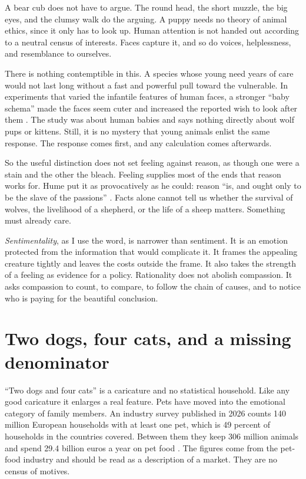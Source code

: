 \documentclass[12pt,a4paper]{book}
\begin{document}
A bear cub does not have to argue. The round head, the short muzzle, the big eyes, and the clumsy walk do the arguing. A puppy needs no theory of animal ethics, since it only has to look up. Human attention is not handed out according to a neutral census of interests. Faces capture it, and so do voices, helplessness, and resemblance to ourselves.

There is nothing contemptible in this. A species whose young need years of care would not last long without a fast and powerful pull toward the vulnerable. In experiments that varied the infantile features of human faces, a stronger ``baby schema'' made the faces seem cuter and increased the reported wish to look after them \cite{GlockerBabySchema2009}. The study was about human babies and says nothing directly about wolf pups or kittens. Still, it is no mystery that young animals enlist the same response. The response comes first, and any calculation comes afterwards.

So the useful distinction does not set feeling against reason, as though one were a stain and the other the bleach. Feeling supplies most of the ends that reason works for. Hume put it as provocatively as he could: reason ``is, and ought only to be the slave of the passions'' \cite[Book~II, Part~III, sec.~3]{Hume-Treatise}. Facts alone cannot tell us whether the survival of wolves, the livelihood of a shepherd, or the life of a sheep matters. Something must already care.

\emph{Sentimentality}, as I use the word, is narrower than sentiment. It is an emotion protected from the information that would complicate it. It frames the appealing creature tightly and leaves the costs outside the frame. It also takes the strength of a feeling as evidence for a policy. Rationality does not abolish compassion. It asks compassion to count, to compare, to follow the chain of causes, and to notice who is paying for the beautiful conclusion.

\section{Two dogs, four cats, and a missing denominator}

``Two dogs and four cats'' is a caricature and no statistical household. Like any good caricature it enlarges a real feature. Pets have moved into the emotional category of family members. An industry survey published in 2026 counts 140 million European households with at least one pet, which is 49 percent of households in the countries covered. Between them they keep 306 million animals and spend 29.4 billion euros a year on pet food \cite{FEDIAFStatistics2026}. The figures come from the pet-food industry and should be read as a description of a market. They are no census of motives.
\end{document}
